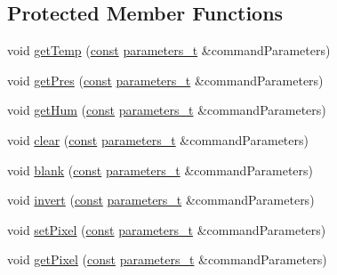\subsection*{Protected Member Functions}
\begin{DoxyCompactItemize}
\item 
void \hyperlink{class_m_q_t_tsense_h_a_t_a39ff54904e181f55b4242c800e60a95f}{get\+Temp} (\hyperlink{functions__c_8js_afacfd9c985d225bb07483b887a801b6f}{const} \hyperlink{_heater_m_q_t_t_8h_ad3b3bd6544a775cf1e31cd71610c5765}{parameters\+\_\+t} \&command\+Parameters)
\item 
void \hyperlink{class_m_q_t_tsense_h_a_t_a30a58adadcb37aeccd992ca9458e17e1}{get\+Pres} (\hyperlink{functions__c_8js_afacfd9c985d225bb07483b887a801b6f}{const} \hyperlink{_heater_m_q_t_t_8h_ad3b3bd6544a775cf1e31cd71610c5765}{parameters\+\_\+t} \&command\+Parameters)
\item 
void \hyperlink{class_m_q_t_tsense_h_a_t_ad61c2741b9e195b607bb8fe6ac9a3832}{get\+Hum} (\hyperlink{functions__c_8js_afacfd9c985d225bb07483b887a801b6f}{const} \hyperlink{_heater_m_q_t_t_8h_ad3b3bd6544a775cf1e31cd71610c5765}{parameters\+\_\+t} \&command\+Parameters)
\item 
void \hyperlink{class_m_q_t_tsense_h_a_t_af05cb64126bd0591d5ca4bac5b48b111}{clear} (\hyperlink{functions__c_8js_afacfd9c985d225bb07483b887a801b6f}{const} \hyperlink{_heater_m_q_t_t_8h_ad3b3bd6544a775cf1e31cd71610c5765}{parameters\+\_\+t} \&command\+Parameters)
\item 
void \hyperlink{class_m_q_t_tsense_h_a_t_a7736e041ad475ec82756223c90da547e}{blank} (\hyperlink{functions__c_8js_afacfd9c985d225bb07483b887a801b6f}{const} \hyperlink{_heater_m_q_t_t_8h_ad3b3bd6544a775cf1e31cd71610c5765}{parameters\+\_\+t} \&command\+Parameters)
\item 
void \hyperlink{class_m_q_t_tsense_h_a_t_aac0a786db57adb1f70f4932bc3800cff}{invert} (\hyperlink{functions__c_8js_afacfd9c985d225bb07483b887a801b6f}{const} \hyperlink{_heater_m_q_t_t_8h_ad3b3bd6544a775cf1e31cd71610c5765}{parameters\+\_\+t} \&command\+Parameters)
\item 
void \hyperlink{class_m_q_t_tsense_h_a_t_a2c2134187487882f89a850b6a7f010ec}{set\+Pixel} (\hyperlink{functions__c_8js_afacfd9c985d225bb07483b887a801b6f}{const} \hyperlink{_heater_m_q_t_t_8h_ad3b3bd6544a775cf1e31cd71610c5765}{parameters\+\_\+t} \&command\+Parameters)
\item 
void \hyperlink{class_m_q_t_tsense_h_a_t_aac431239ec91b0c7647fc90f2780d5e3}{get\+Pixel} (\hyperlink{functions__c_8js_afacfd9c985d225bb07483b887a801b6f}{const} \hyperlink{_heater_m_q_t_t_8h_ad3b3bd6544a775cf1e31cd71610c5765}{parameters\+\_\+t} \&command\+Parameters)

\end{DoxyCompactItemize}
